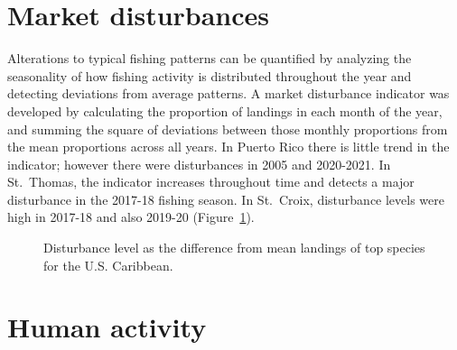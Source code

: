 \documentclass[
  letterpaper,
  oneside,
  open=any]{scrbook}
\begin{document}
\section{Market disturbances}\label{market-disturbances}

Alterations to typical fishing patterns can be quantified by analyzing
the seasonality of how fishing activity is distributed throughout the
year and detecting deviations from average patterns. A market
disturbance indicator was developed by calculating the proportion of
landings in each month of the year, and summing the square of deviations
between those monthly proportions from the mean proportions across all
years. In Puerto Rico there is little trend in the indicator; however
there were disturbances in 2005 and 2020-2021. In St.~Thomas, the
indicator increases throughout time and detects a major disturbance in
the 2017-18 fishing season. In St.~Croix, disturbance levels were high
in 2017-18 and also 2019-20 (Figure~\ref{fig-dist}).

\begin{figure}


\caption{\label{fig-dist}Disturbance level as the difference from mean
landings of top species for the U.S. Caribbean.}

\end{figure}%

\section{Human activity}\label{human-activity}
\end{document}
